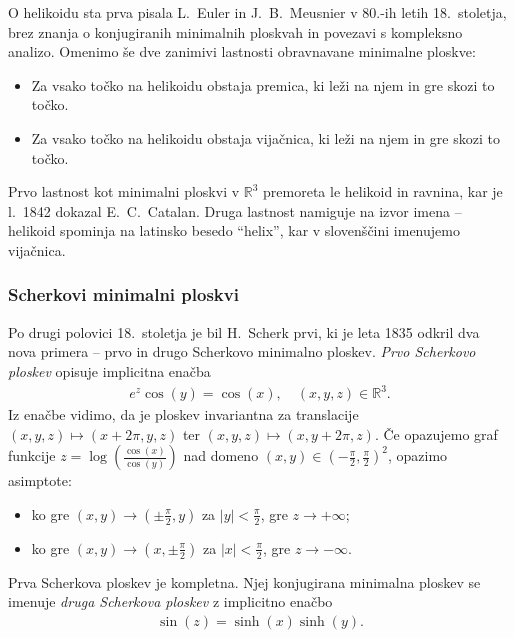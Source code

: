 \documentclass[12pt,a4paper,twoside]{article}
\theoremstyle{definition} %
\theoremstyle{plain} %
\numberwithin{equation}{section}  %
\newcommand{\R}{\mathbb R}
\begin{document}
O helikoidu sta prva pisala L.~Euler in J.~B.~Meusnier v 80.-ih letih 18.~stoletja, brez znanja o konjugiranih minimalnih ploskvah in povezavi s kompleksno analizo. Omenimo še dve zanimivi lastnosti obravnavane minimalne ploskve:
\begin{itemize}
\item Za vsako točko na helikoidu obstaja premica, ki leži na njem in gre skozi to točko.
\item Za vsako točko na helikoidu obstaja vijačnica, ki leži na njem in gre skozi to točko.
\end{itemize}
Prvo lastnost kot minimalni ploskvi v $\mathbb{R}^3$ premoreta le helikoid in ravnina, kar je l.~1842 dokazal E.~C.~Catalan. Druga lastnost namiguje na izvor imena -- helikoid spominja na latinsko besedo ``helix'', kar v slovenščini imenujemo vijačnica.

\subsubsection{Scherkovi minimalni ploskvi}
% 
Po drugi polovici 18.~stoletja je bil H.~Scherk prvi, ki je leta 1835 odkril dva nova primera -- prvo in drugo Scherkovo minimalno ploskev. 
\emph{Prvo Scherkovo ploskev} opisuje implicitna enačba
\begin{gather}
e^{z} \cos(y) = \cos(x), \quad (x,y,z) \in \R^3.
\end{gather}
Iz enačbe vidimo, da je ploskev invariantna za translacije $(x,y,z) \mapsto (x+2\pi,y,z)$ ter $(x,y,z) \mapsto (x,y+2\pi,z)$.
Če opazujemo graf funkcije $z = \log \left(\frac{\cos(x)}{\cos(y)} \right)$ nad domeno $(x,y) \in \left( -\frac{\pi}{2}, \frac{\pi}{2} \right)^2$, opazimo asimptote:
\begin{itemize}
\item ko gre $(x,y) \to \left( \pm \frac{\pi}{2}, y \right)$ za $|y| < \frac{\pi}{2}$, gre $z \to +\infty$;
\item ko gre $(x,y) \to \left( x, \pm \frac{\pi}{2} \right)$ za $|x| < \frac{\pi}{2}$, gre $z \to -\infty$.
\end{itemize}
Prva Scherkova ploskev je kompletna. 
Njej konjugirana minimalna ploskev se imenuje \emph{druga Scherkova ploskev} z implicitno enačbo
\begin{gather}
\sin(z) = \sinh(x) \sinh(y).
\end{gather}
\end{document}
